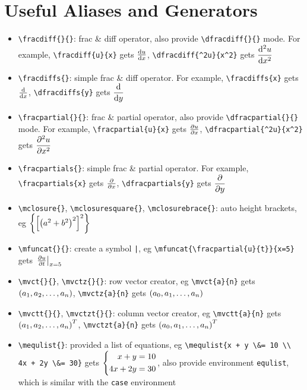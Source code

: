 \documentclass{article}
\begin{document}
\section{Useful Aliases and Generators}
\begin{itemize}
\item \lstinline`\fracdiff{}{}`: frac \& diff operator, also provide \lstinline`\dfracdiff{}{}` mode. For example, \lstinline`\fracdiff{u}{x}` gets ${\frac{\operatorname{d\!} {u}}{\operatorname{d\!} {x}}}$, \lstinline`\dfracdiff{^2u}{x^2}` gets ${\dfrac{\operatorname{d\!} {^2u}}{\operatorname{d\!} {x^2}}}$

\item \lstinline`\fracdiffs{}`: simple frac \& diff operator. For example, \lstinline`\fracdiffs{x}` gets ${{\frac{\operatorname{d\!} {}}{\operatorname{d\!} {x}}}}$, \lstinline`\dfracdiffs{y}` gets ${{\dfrac{\operatorname{d\!} {}}{\operatorname{d\!} {y}}}}$

\item \lstinline`\fracpartial{}{}`: frac \& partial operator, also provide \lstinline`\dfracpartial{}{}` mode. For example, \lstinline`\fracpartial{u}{x}` gets ${\frac{\partial {u}}{\partial {x}}}$, \lstinline`\dfracpartial{^2u}{x^2}` gets ${\dfrac{\partial {^2u}}{\partial {x^2}}}$

\item \lstinline`\fracpartials{}`: simple frac \& partial operator. For example, \lstinline`\fracpartials{x}` gets ${{\frac{\partial {}}{\partial {x}}}}$, \lstinline`\dfracpartials{y}` gets ${{\dfrac{\partial {}}{\partial {y}}}}$

\item \lstinline`\mclosure{}`, \lstinline`\mclosuresquare{}`, \lstinline`\mclosurebrace{}`: auto height brackets, eg ${\left\{ { {\left[ { {\left( {a^2 + b^2} \right)}^2 } \right]}^2 } \right\}}$

\item \lstinline`\mfuncat{}{}`: create a symbol \lstinline`|`, eg \lstinline`\mfuncat{\fracpartial{u}{t}}{x=5}` gets ${\left.{{\frac{\partial {u}}{\partial {t}}}} \right|}_{x=5}$

\item \lstinline`\mvct{}{}`, \lstinline`\mvctz{}{}`: row vector creator, eg \lstinline`\mvct{a}{n}` gets ${ ({a}_1, {a}_2, \ldots, {a}_{n}) }$, \lstinline`\mvctz{a}{n}` gets ${ ({a}_0, {a}_1, \ldots, {a}_{n}) }$

\item \lstinline`\mvctt{}{}`, \lstinline`\mvctzt{}{}`: column vector creator, eg \lstinline`\mvctt{a}{n}` gets ${ { ({a}_1, {a}_2, \ldots, {a}_{n}) }^T }$, \lstinline`\mvctzt{a}{n}` gets ${ { ({a}_0, {a}_1, \ldots, {a}_{n}) }^T }$

\item \lstinline`\mequlist{}`: provided a list of equations, eg \lstinline`\mequlist{x + y \&= 10 \\ 4x + 2y \&= 30}` gets ${\left\{ \begin{aligned} x + y &= 10 \\ 4x + 2y &= 30 \end{aligned} \right.}$, also provide environment \lstinline`equlist`, which is similar with the \lstinline`case` environment
\end{itemize}

\end{document}
